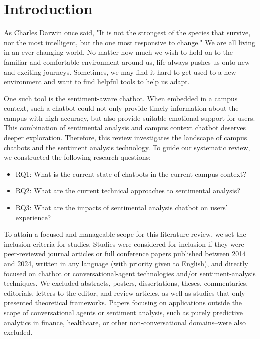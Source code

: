 \documentclass{xum_review}
\begin{document}
\tableofcontents
\newpage

\section{Introduction}
As Charles Darwin once said, "It is not the strongest of the species that
survive, nor the most intelligent, but the one most responsive to change." We
are all living in an ever-changing world. No matter how much we wish to hold on
to the familiar and comfortable environment around us, life always pushes us
onto new and exciting journeys. Sometimes, we may find it hard to get used to a
new environment and want to find helpful tools to help us adapt. 

One such tool is the sentiment-aware chatbot. When embedded in a campus context,
such a chatbot could not only provide timely information about the campus with
high accuracy, but also provide suitable emotional support for users. This
combination of sentimental analysis and campus context chatbot deserves deeper
exploration. Therefore, this review investigates the landscape of campus
chatbots and the sentiment analysis technology. To guide our systematic review,
we constructed the following research questions:
\begin{itemize}
    \item RQ1: What is the current state of chatbots in the current campus
    context?
    \item RQ2: What are the current technical approaches to sentimental
    analysis?
    \item RQ3: What are the impacts of sentimental analysis chatbot on users'
    experience?
\end{itemize}

To attain a focused and manageable scope for this literature review, we set the
inclusion criteria for studies. Studies were considered for inclusion if they
were peer-reviewed journal articles or full conference papers published between
2014 and 2024, written in any language (with priority given to English), and
directly focused on chatbot or conversational-agent technologies and/or
sentiment-analysis techniques. We excluded abstracts, posters, dissertations,
theses, commentaries, editorials, letters to the editor, and review articles, as
well as studies that only presented theoretical frameworks. Papers focusing on
applications outside the scope of conversational agents or sentiment
analysis, such as purely predictive analytics in finance, healthcare, or other
non-conversational domains--were also excluded.
\end{document}
